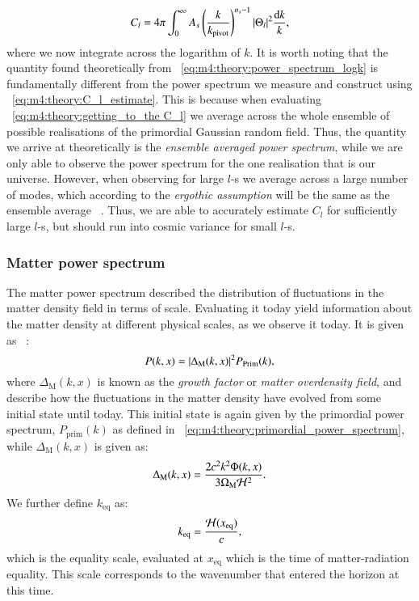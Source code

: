        \begin{equation}\label{eq:m4:theory:power_spectrum_logk}
            C_l = 4\pi\int_0^\infty A_s\left(\frac{k}{k_\mathrm{pivot}}\right)^{n_s-1}\abs{\Theta_l}^2\frac{\mathrm{d} k}{k},
        \end{equation}
        where we now integrate across the logarithm of $k$. It is worth noting that the quantity found theoretically from ~\cref{eq:m4:theory:power_spectrum_logk} is fundamentally different from the power spectrum we measure and construct using ~\cref{eq:m4:theory:C_l_estimate}. This is because when evaluating ~\cref{eq:m4:theory:getting_to_the C_l} we average across the whole ensemble of possible realisations of the primordial Gaussian random field. Thus, the quantity we arrive at theoretically is the \textit{ensemble averaged power spectrum}, while we are only able to observe the power spectrum for the one realisation that is our universe. However, when observing for large $l$-s we average across a large number of modes, which according to the \textit{ergothic assumption} will be the same as the ensemble average ~\cite{AST5220LectureNotes}. Thus, we are able to accurately estimate $C_l$ for sufficiently large $l$-s, but should run into cosmic variance for small $l$-s. 


    \subsubsection{Matter power spectrum}
        The matter power spectrum described the distribution of fluctuations in the matter density field in terms of scale. Evaluating it today yield information about the matter density at different physical scales, as we observe it today. It is given as ~\cite{AST5220LectureNotes}:
        \begin{equation}\label{eq:m4:theory:matter_power_spectrum}
            P(k,x) = \abs{\Delta_\mathrm{M}(k,x)}^2P_\mathrm{Prim}(k),
        \end{equation}
        where $\Delta_\mathrm{M}(k,x)$ is known as the \textit{growth factor} or \textit{matter overdensity field}, and describe how the fluctuations in the matter density have evolved from some initial state until today. This initial state is again given by the primordial power spectrum, $P_\mathrm{prim}(k)$ as defined in ~\cref{eq:m4:theory:primordial_power_spectrum}, while $\Delta_\mathrm{M}(k,x)$ is given as:
        \begin{equation}\label{eq:m4:theory:growth_factor}
            \Delta_\mathrm{M}(k,x) = \frac{2c^2k^2\Phi(k,x)}{3\Omega_\mathrm{M}\mathcal{H}^2}.
        \end{equation}
        We further define $k_\mathrm{eq}$ as:
        \begin{equation}\label{eq:m4:theory:mps_keq}
            k_\mathrm{eq} = \frac{\mathcal{H}(x_\mathrm{eq})}{c},
        \end{equation}
        which is the equality scale, evaluated at $x_\mathrm{eq}$ which is the time of matter-radiation equality. This scale corresponds to the wavenumber that entered the horizon at this time. 
